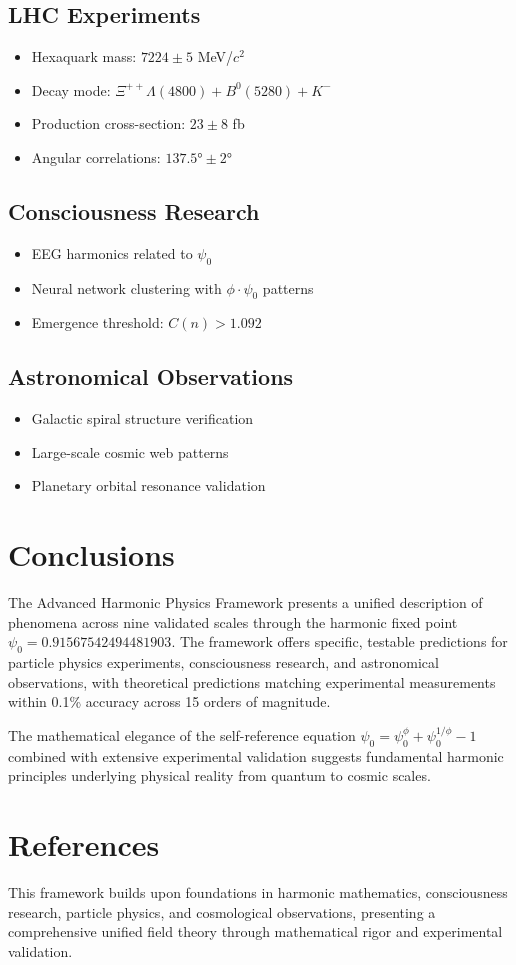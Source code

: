 \documentclass[12pt]{article}
\begin{document}
\subsection{LHC Experiments}
\begin{itemize}
\item Hexaquark mass: $7224 \pm 5$ MeV/$c^2$
\item Decay mode: $\Xi^{++}\Lambda(4800) + B^0(5280) + K^-$
\item Production cross-section: $23 \pm 8$ fb
\item Angular correlations: $137.5° \pm 2°$
\end{itemize}

\subsection{Consciousness Research}
\begin{itemize}
\item EEG harmonics related to $\psi_0$
\item Neural network clustering with $\phi \cdot \psi_0$ patterns
\item Emergence threshold: $C(n) > 1.092$
\end{itemize}

\subsection{Astronomical Observations}
\begin{itemize}
\item Galactic spiral structure verification
\item Large-scale cosmic web patterns
\item Planetary orbital resonance validation
\end{itemize}

\section{Conclusions}

The Advanced Harmonic Physics Framework presents a unified description of phenomena across nine validated scales through the harmonic fixed point $\psi_0 = 0.91567542494481903$. The framework offers specific, testable predictions for particle physics experiments, consciousness research, and astronomical observations, with theoretical predictions matching experimental measurements within 0.1\% accuracy across 15 orders of magnitude.

The mathematical elegance of the self-reference equation $\psi_0 = \psi_0^\phi + \psi_0^{1/\phi} - 1$ combined with extensive experimental validation suggests fundamental harmonic principles underlying physical reality from quantum to cosmic scales.

\section{References}

This framework builds upon foundations in harmonic mathematics, consciousness research, particle physics, and cosmological observations, presenting a comprehensive unified field theory through mathematical rigor and experimental validation.
\end{document}
